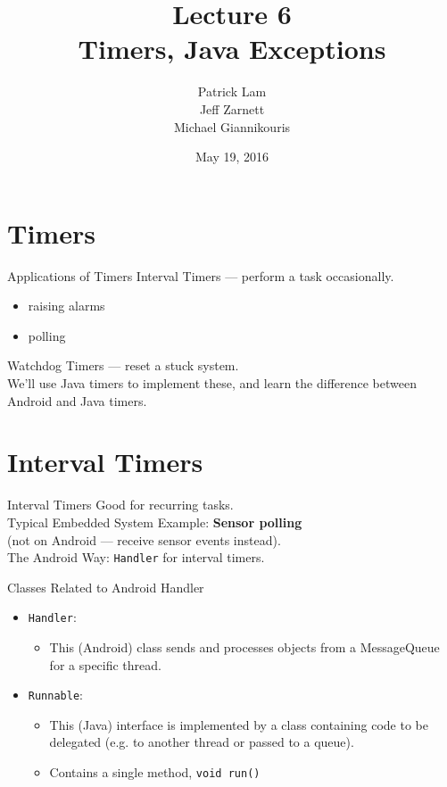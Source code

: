 \documentclass[aspectratio=169]{beamer}
\title{Lecture 6 \\ Timers, Java Exceptions}
\date{May 19, 2016}
\author{Patrick Lam \\ Jeff Zarnett \\ Michael Giannikouris}
\institute{Department of Electrical and Computer Engineering}
\begin{document}
\maketitle



\section*{Timers}



\begin{frame}{Applications of Timers}
\Large
Interval Timers --- perform a task occasionally.\\
\begin{itemize}
\item raising alarms
\item polling
\end{itemize}
Watchdog Timers --- reset a stuck system.
~\\[1.5em]
We'll use Java timers to implement these,
and learn the difference between Android and Java timers.
\end{frame}



\section{Interval Timers}



\begin{frame}{Interval Timers}
\Large
Good for recurring tasks.\\[1em]
\vspace{1em}
Typical Embedded System Example: \textbf{Sensor polling} \\
\quad (not on Android --- receive sensor events instead).\\[1em]
\vspace{1em}
The Android Way: {\tt Handler} for interval timers.
\end{frame}



\begin{frame}{Classes Related to Android Handler}
\begin{itemize}
\item \texttt{Handler}: 
\begin{itemize}\item This (Android) class sends and processes objects from a MessageQueue for a specific thread. \end{itemize}
\item \texttt{Runnable}: 
\begin{itemize}
\item This (Java) interface is implemented by a class containing code to be delegated (e.g. to another thread or passed to a queue). \\
\item Contains a single method, \texttt{void run()}\\
\end{itemize}
\end{itemize}
\end{frame}
\end{document}
